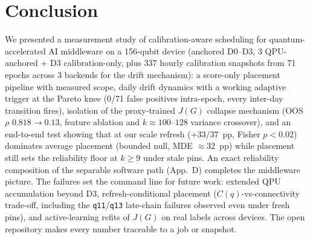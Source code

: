 \documentclass[journal,10pt,twocolumn]{IEEEtran}
\newcommand{\q}[1]{\texttt{q#1}}
\begin{document}
\section{Conclusion}
We presented a measurement study of calibration-aware scheduling for quantum-accelerated AI middleware on
a 156-qubit device (anchored D0--D3, 3 QPU-anchored + D3 calibration-only, plus 337 hourly calibration snapshots from 71 epochs across 3 backends for the drift mechanism): a
score-only placement pipeline with measured scope, daily drift dynamics with a working adaptive trigger at the
Pareto knee (0/71 false positives intra-epoch, every inter-day transition fires), isolation of the proxy-trained $J(G)$ collapse mechanism (OOS $\rho$ $0.818{\to}0.13$, feature
ablation and $k\approx100$--$128$ variance crossover), and an end-to-end test showing that at our scale
refresh ($+33/37$~pp, Fisher $p{<}0.02$) dominates average placement (bounded null, MDE $\approx32$~pp) while
placement still sets the reliability floor at $k\ge9$ under stale pins. An exact reliability composition of the
separable software path (App.~D) completes the middleware picture. The failures set the command line for future
work: extended QPU accumulation beyond D3, refresh-conditional placement ($C(q)$-vs-connectivity trade-off,
including the \q{11}/\q{13} late-chain failures observed even under fresh pins), and active-learning refits of
$J(G)$ on real labels across devices. The open repository makes every number traceable to a job or snapshot.
\end{document}
